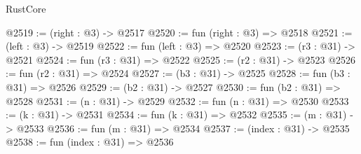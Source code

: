 \begin{lexlean}{RustCore}
\begin{coremodule}
@2519 := (right : @3) -> @2517
@2520 := fun (right : @3) => @2518
@2521 := (left : @3) -> @2519
@2522 := fun (left : @3) => @2520
@2523 := (r3 : @31) -> @2521
@2524 := fun (r3 : @31) => @2522
@2525 := (r2 : @31) -> @2523
@2526 := fun (r2 : @31) => @2524
@2527 := (b3 : @31) -> @2525
@2528 := fun (b3 : @31) => @2526
@2529 := (b2 : @31) -> @2527
@2530 := fun (b2 : @31) => @2528
@2531 := (n : @31) -> @2529
@2532 := fun (n : @31) => @2530
@2533 := (k : @31) -> @2531
@2534 := fun (k : @31) => @2532
@2535 := (m : @31) -> @2533
@2536 := fun (m : @31) => @2534
@2537 := (index : @31) -> @2535
@2538 := fun (index : @31) => @2536
\end{coremodule}
\end{lexlean}

